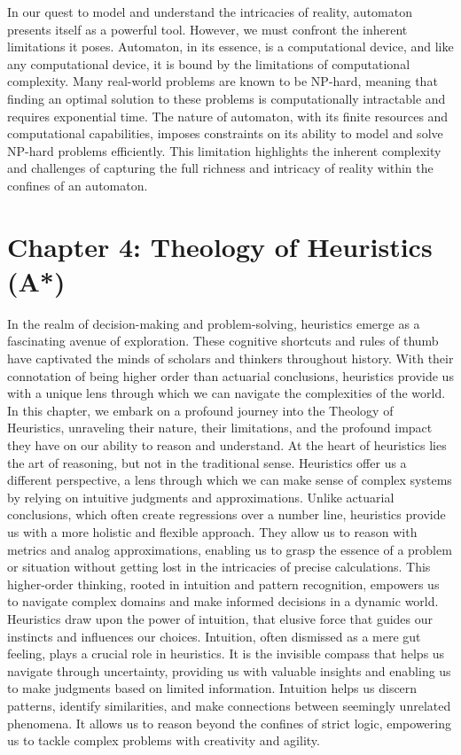\documentclass[ebook,12pt,oneside,openany]{memoir}
\begin{document}
	In our quest to model and understand the intricacies of reality, automaton presents itself as a powerful tool. However, we must confront the inherent limitations it poses. Automaton, in its essence, is a computational device, and like any computational device, it is bound by the limitations of computational complexity. Many real-world problems are known to be NP-hard, meaning that finding an optimal solution to these problems is computationally intractable and requires exponential time. The nature of automaton, with its finite resources and computational capabilities, imposes constraints on its ability to model and solve NP-hard problems efficiently. This limitation highlights the inherent complexity and challenges of capturing the full richness and intricacy of reality within the confines of an automaton.
\chapter*{Chapter 4: Theology of Heuristics (A*)}
In the realm of decision-making and problem-solving, heuristics emerge as a fascinating avenue of exploration. These cognitive shortcuts and rules of thumb have captivated the minds of scholars and thinkers throughout history. With their connotation of being higher order than actuarial conclusions, heuristics provide us with a unique lens through which we can navigate the complexities of the world. In this chapter, we embark on a profound journey into the Theology of Heuristics, unraveling their nature, their limitations, and the profound impact they have on our ability to reason and understand.
At the heart of heuristics lies the art of reasoning, but not in the traditional sense. Heuristics offer us a different perspective, a lens through which we can make sense of complex systems by relying on intuitive judgments and approximations. Unlike actuarial conclusions, which often create regressions over a number line, heuristics provide us with a more holistic and flexible approach. They allow us to reason with metrics and analog approximations, enabling us to grasp the essence of a problem or situation without getting lost in the intricacies of precise calculations. This higher-order thinking, rooted in intuition and pattern recognition, empowers us to navigate complex domains and make informed decisions in a dynamic world.
Heuristics draw upon the power of intuition, that elusive force that guides our instincts and influences our choices. Intuition, often dismissed as a mere gut feeling, plays a crucial role in heuristics. It is the invisible compass that helps us navigate through uncertainty, providing us with valuable insights and enabling us to make judgments based on limited information. Intuition helps us discern patterns, identify similarities, and make connections between seemingly unrelated phenomena. It allows us to reason beyond the confines of strict logic, empowering us to tackle complex problems with creativity and agility.
\end{document}
